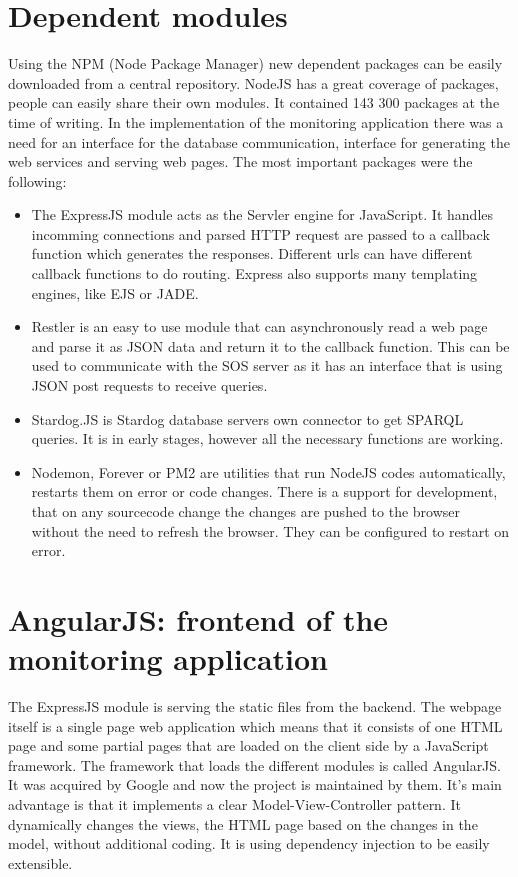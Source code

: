 \section{Dependent modules}

Using the NPM (Node Package Manager) new dependent packages can be easily downloaded from a central  repository. NodeJS has a great coverage of packages, people can easily share their own modules. It contained 143 300 packages at the time of writing. In the implementation of the monitoring application there was a need for an interface for the database communication, interface for generating the web services and serving web pages. The most important packages were the following: 
\begin{itemize}

\item The ExpressJS module acts as the Servler engine for JavaScript. It handles incomming connections and parsed HTTP request are passed to a callback function which generates the responses. Different urls can have different callback functions to do routing. Express also supports many templating engines, like EJS or JADE.

\item Restler is an easy to use module that can asynchronously read a web page and parse it as JSON data and return it to the callback function. This can be used to communicate with the SOS server as it has an interface that is using JSON post requests to 
receive queries.

\item Stardog.JS is Stardog database servers own connector to get SPARQL queries. It is in early stages, however all the necessary functions are working. 

\item Nodemon, Forever or PM2 are utilities that run NodeJS codes automatically, restarts them on error or code changes. There is a support for development, that on any sourcecode change the changes are pushed to the browser without the need to refresh the browser. They can be configured to restart on error.
\end{itemize}

\section{AngularJS: frontend of the monitoring application}

The ExpressJS module is serving the static files from the backend. The webpage itself is a single page web application which means that it consists of one HTML page and some partial pages that are loaded on the client side by a JavaScript framework. The framework that loads the different modules is called AngularJS. It was acquired by Google and now the project is maintained by them\cite{angular}. It's main advantage is that it implements a clear Model-View-Controller pattern. It dynamically changes the views, the HTML page based on the changes in the model, without additional coding.
It is using dependency injection to be easily extensible.

